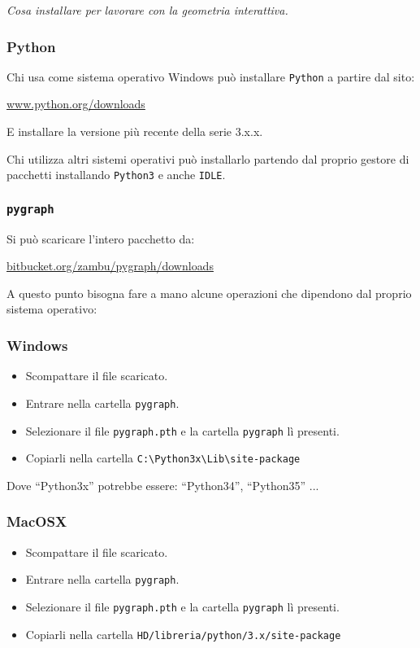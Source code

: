 \emph{Cosa installare per lavorare con la geometria interattiva.}

\subsubsection{Python}

Chi usa come sistema operativo Windows può installare \texttt{Python} 
a partire dal sito:

\url{www.python.org/downloads}

E installare la versione più recente della serie 3.x.x.

Chi utilizza altri sistemi operativi può installarlo partendo dal proprio
gestore di pacchetti installando \texttt{Python3} e anche \texttt{IDLE}.

\subsubsection{\texttt{pygraph}}

Si può scaricare l'intero pacchetto da:

\url{bitbucket.org/zambu/pygraph/downloads}

A questo punto bisogna fare a mano alcune operazioni che dipendono dal 
proprio sistema operativo:

\subsubsection*{Windows}

\begin{itemize} [noitemsep]
\item {} Scompattare il file scaricato.
\item {} Entrare nella cartella \texttt{pygraph}.
\item {} Selezionare il file \texttt{pygraph.pth} e la cartella 
  \texttt{pygraph} lì presenti.
\item {} Copiarli nella cartella 
\texttt{C:\textbackslash Python3x\textbackslash Lib\textbackslash site-package}
\end{itemize}

Dove ``Python3x'' potrebbe essere: ``Python34'', ``Python35'' ...

\subsubsection*{MacOSX}

\begin{itemize} [noitemsep]
\item {} Scompattare il file scaricato.
\item {} Entrare nella cartella \texttt{pygraph}.
\item {} Selezionare il file \texttt{pygraph.pth} e la cartella 
  \texttt{pygraph} lì presenti.
\item {} Copiarli nella cartella \texttt{HD/libreria/python/3.x/site-package}
\end{itemize}

